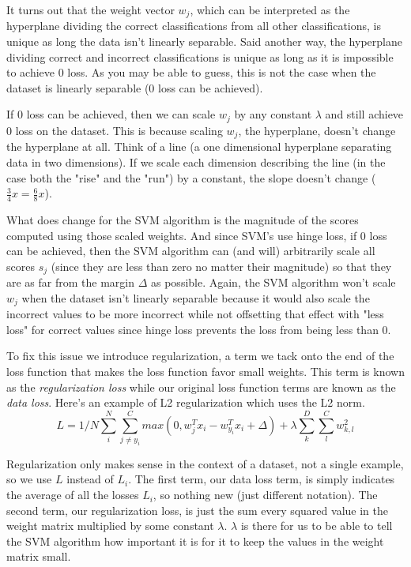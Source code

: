 \documentclass[12pt]{article}
\begin{document}
It turns out that the weight vector $w_j$, which can be interpreted as the hyperplane dividing
the correct classifications from all other classifications, is unique as long the data
isn't linearly separable. Said another way, the hyperplane dividing correct and incorrect 
classifications is unique as long as it is impossible to achieve 0 loss.
As you may be able to guess, this is not the case when the dataset is linearly 
separable (0 loss can be achieved). 

If 0 loss can be achieved, then we can scale $w_j$ by any constant $\lambda$ and still
achieve 0 loss on the dataset. This is because scaling $w_j$, the hyperplane, doesn't change
the hyperplane at all. Think of a line (a one dimensional hyperplane separating data
in two dimensions). If we scale each dimension describing the line (in the case both the "rise"
and the "run") by a constant, the slope doesn't change ($\frac{3}{4}x = \frac{6}{8}x$).

What does change for the SVM algorithm is the magnitude of the scores computed using
those scaled weights. And since SVM's use hinge loss, if 0 loss can be achieved, 
then the SVM algorithm can (and will) arbitrarily scale all scores $s_j$ (since they are less
than zero no matter their magnitude) so that they are as far from the margin $\Delta$ 
as possible. Again, the SVM algorithm won't scale $w_j$ when the dataset isn't linearly 
separable because it would also scale the incorrect values to be more incorrect while not 
offsetting that effect with "less loss" for correct values since hinge loss prevents the 
loss from being less than 0. 

To fix this issue we introduce regularization, a term we tack onto the end of the loss function
that makes the loss function favor small weights. This term is known as the \emph{regularization 
loss} while our original loss function terms are known as the \emph{data loss}. 
Here's an example of L2 regularization which uses the L2 norm. 
\begin{equation}
    L = 1/N \sum_{i}^N \sum_{j \neq y_{i}}^C max(0, w_{j}^T x_i - w_{y_i}^T x_i + \Delta)
    + \lambda \sum_{k}^D \sum_{l}^C w_{k, l}^2
\end{equation}

Regularization only makes sense in the context of a dataset, not a single example, 
so we use $L$ instead of $L_i$. The first term, our data loss term, is simply indicates the average of all
the losses $L_i$, so nothing new (just different notation). The second term, our 
regularization loss, is just the sum every squared value in the weight matrix multiplied
by some constant $\lambda$. $\lambda$ is there for us to be able to tell the SVM algorithm how 
important it is for it to keep the values in the weight matrix small. 
\end{document}
